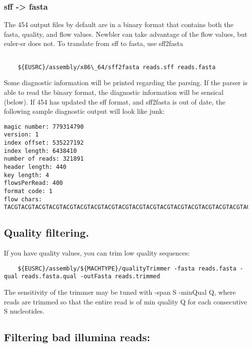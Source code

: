 \documentclass{article}[12pt]
\begin{document}
\subsubsection{sff -> fasta}

  The 454 output files by default are in a binary format that contains
  both the fasta, quality, and flow values.  Newbler can take
  advantage of the flow values, but euler-sr does not.  To translate
  from sff to fasta, use sff2fasta
\begin{verbatim}

	${EUSRC}/assembly/x86\_64/sff2fasta reads.sff reads.fasta
\end{verbatim}

	Some diagnostic information will be printed regarding the parsing.
	If the parser is able to read the binary format, the diagnostic
	information will be sensical (below). If 454 has updated the sff
	format, and sff2fasta is out of date, the following sample
	diagnostic output will look like junk:


\begin{verbatim}
magic number: 779314790
version: 1
index offset: 535227192
index length: 6438410
number of reads: 321891
header length: 440
key length: 4
flowsPerRead: 400
format code: 1
flow chars: TACGTACGTACGTACGTACGTACGTACGTACGTACGTACGTACGTACGTACGTACGTACGTACGTACGTACGTACGTACGTACGTACGTACGTACGTACGTACGTACGTACGTACGTACGTACGTACGTACGTACGTACGTACGTACGTACGTACGTACGTACGTACGTACGTACGTACGTACGTACGTACGTACGTACGTACGTACGTACGTACGTACGTACGTACGTACGTACGTACGTACGTACGTACGTACGTACGTACGTACGTACGTACGTACGTACGTACGTACGTACGTACGTACGTACGTACGTACGTACGTACGTACGTACGTACGTACGTACGTACGTACGTACGTACGTACGTACGTACGTACGTACGTACGTACGTACGTACGTACG
\end{verbatim}

\subsection{ Quality filtering.}
	
  If you have quality values, you can trim low quality sequences:

\begin{verbatim}
	${EUSRC}/assembly/${MACHTYPE}/qualityTrimmer -fasta reads.fasta	-qual reads.fasta.qual -outFasta reads.trimmed 
\end{verbatim}
	The sensitivity of the trimmer may be tuned with -span S -minQual Q,
	where reads are trimmed so that the entire read is of min quality Q
	for each consecutive S nucleotides.
	

\subsection{ Filtering bad illumina reads:}
\end{document}

